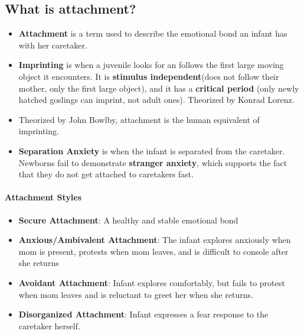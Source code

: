 \documentclass[10pt,letter]{article}
\theoremstyle{plain}
\theoremstyle{definition}
\begin{document}
\subsection*{What is attachment?}
\begin{itemize}
    \item \textbf{Attachment} is a term used to describe the emotional bond an infant has with her caretaker. 
    \item \textbf{Imprinting} is when a juvenile looks for an follows the first large moving object it encounters. It is \textbf{stimulus independent}(does not follow their mother, only the first large object), and it has a \textbf{critical period} (only newly hatched goslings can imprint, not adult ones). Theorized by Konrad Lorenz.
    \item Theorized by John Bowlby, attachment is the human equivalent of imprinting.
    \item \textbf{Separation Anxiety} is when the infant is separated from the caretaker. Newborns fail to demonstrate \textbf{stranger anxiety}, which supports the fact that they do not get attached to caretakers fast. 
\end{itemize}
\paragraph{Attachment Styles}
\begin{itemize}
    \item \textbf{Secure Attachment}: A healthy and stable emotional bond 
    \item \textbf{Anxious/Ambivalent Attachment}: The infant explores anxiously when mom is present, protests when mom leaves, and is difficult to console after she returns 
    \item \textbf{Avoidant Attachment}: Infant explores comfortably, but fails to protest when mom leaves and is reluctant to greet her when she returns. 
    \item \textbf{Disorganized Attachment}: Infant expresses a fear response to the caretaker herself. 
\end{itemize}
\end{document}
